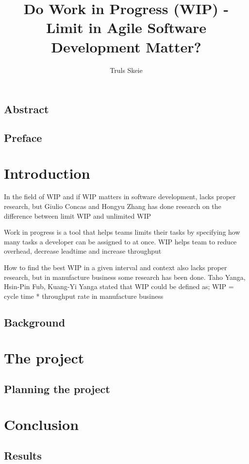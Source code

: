 \documentclass[UKenglish]{ifimaster}  %
\title{Do Work in Progress (WIP) - Limit in Agile Software Development Matter?}        %
\author{Truls Skeie}                      %
\begin{document}
\ififorside{}
\frontmatter{}
\maketitle{}

\chapter*{Abstract}                   %

\tableofcontents{}
\listoffigures{}
\listoftables{}

\chapter*{Preface}                    %

\mainmatter{}
\part{Introduction}                   %
In the field of WIP and if WIP matters in software development, lacks proper research, but Giulio Concas and Hongyu Zhang has done research on the difference between limit WIP and unlimited WIP  \cite{SMR:SMR1599}

Work in progress is a tool that helps teams limits their tasks by specifying how many tasks a developer can be assigned to at once. WIP helps team to reduce overhead, decrease leadtime and increase throughput %

How to find the best WIP in a given interval and context also lacks proper research, but in manufacture business some research has been done. Taho Yanga, Hsin-Pin Fub, Kuang-Yi Yanga stated that WIP could be defined as; WIP = cycle time * throughput rate in manufacture business \cite{Yang2007104}

\chapter{Background}                  %


\part{The project}                    %

\chapter{Planning the project}        %


\part{Conclusion}                     %

\chapter{Results}                     %


\backmatter{}
\printbibliography
\end{document}
